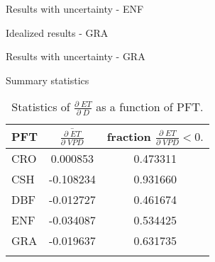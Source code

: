 \documentclass{beamer}
\begin{document}
{ %
    \begin{frame}[plain]{Results with uncertainty - ENF}
     \end{frame}
   }

{ %
    \begin{frame}[plain]{Idealized results - GRA}
     \end{frame}
}

{ %
    \begin{frame}[plain]{Results with uncertainty - GRA}
     \end{frame}
   }

   \begin{frame}{Summary statistics}
     \begin{table}
       \caption{Statistics of $\frac{\partial \; ET}{\partial \; D}$ as a function of PFT.}
       \centering
       \begin{tabular}{l c c}
         \hline
         PFT & $\overline{\frac{\partial \; ET}{\partial \; VPD}}$ & fraction $\frac{\partial \; ET}{\partial \; VPD} < 0.$ \\
         \hline
         CRO & 0.000853  & 0.473311\\
         CSH & -0.108234 & 0.931660\\
         DBF & -0.012727 & 0.461674\\
         ENF & -0.034087 & 0.534425\\
         GRA & -0.019637 & 0.631735\\
         \hline
         \multicolumn{2}{l}{}  
       \end{tabular}
     \end{table}
   \end{frame}
     
\end{document}
